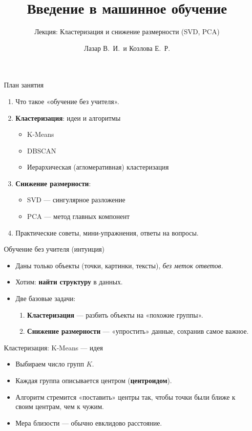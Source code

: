 \documentclass[aspectratio=169]{beamer}
\title{Введение в машинное обучение}
\subtitle{Лекция: Кластеризация и снижение размерности (SVD, PCA)}
\author{Лазар В.~И.\ и Козлова Е.~Р.}
\newcommand{\term}[1]{\textbf{#1}}
\begin{document}
\begin{frame}
	\titlepage
\end{frame}

\begin{frame}{План занятия}
	\begin{enumerate}
		\item Что такое «обучение без учителя».
		\item \term{Кластеризация}: идеи и алгоритмы
		      \begin{itemize}
			      \item K-Means
			      \item DBSCAN
			      \item Иерархическая (агломеративная) кластеризация
		      \end{itemize}
		\item \term{Снижение размерности}:
		      \begin{itemize}
			      \item SVD — сингулярное разложение
			      \item PCA — метод главных компонент
		      \end{itemize}
		\item Практические советы, мини-упражнения, ответы на вопросы.
	\end{enumerate}
\end{frame}

\begin{frame}{Обучение без учителя (интуиция)}
	\begin{itemize}
		\item Даны только объекты (точки, картинки, тексты), \emph{без меток ответов}.
		\item Хотим: \term{найти структуру} в данных.
		\item Две базовые задачи:
		      \begin{enumerate}
			      \item \term{Кластеризация} — разбить объекты на «похожие группы».
			      \item \term{Снижение размерности} — «упростить» данные, сохранив самое важное.
		      \end{enumerate}
	\end{itemize}
\end{frame}

\begin{frame}{Кластеризация: K-Means — идея}
	\begin{itemize}
		\item Выбираем число групп \(K\).
		\item Каждая группа описывается центром (\term{центроидом}).
		\item Алгоритм стремится «поставить» центры так, чтобы точки были ближе к своим центрам, чем к чужим.
		\item Мера близости — обычно евклидово расстояние.
	\end{itemize}
\end{frame}
\end{document}
